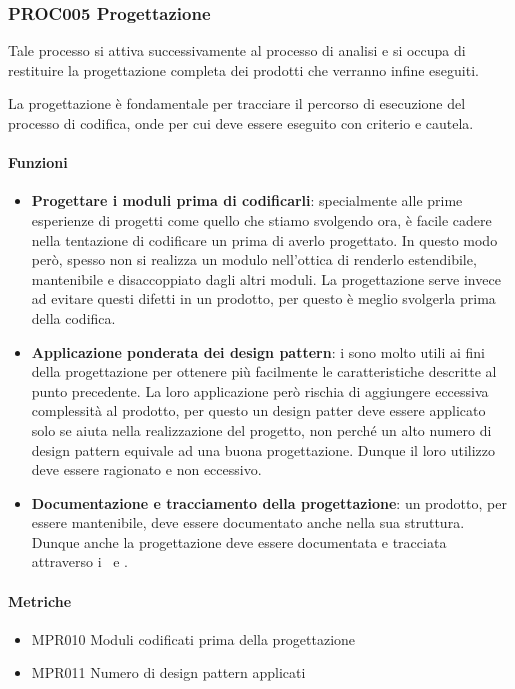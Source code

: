     \subsubsection{PROC005 Progettazione}\label{proc005}
    Tale processo si attiva successivamente al processo di analisi e si occupa di restituire la progettazione completa dei prodotti che verranno infine eseguiti. \par
    La progettazione è fondamentale per tracciare il percorso di esecuzione del processo di codifica, onde per cui deve essere eseguito con criterio e cautela.

        \paragraph*{Funzioni}
        \begin{itemize}
            \item \textbf{Progettare i moduli prima di codificarli}: specialmente alle prime esperienze di progetti come quello che stiamo svolgendo ora, è facile cadere nella tentazione di codificare un  prima di averlo progettato. In questo modo però, spesso non si realizza un modulo nell'ottica di renderlo estendibile, mantenibile e disaccoppiato dagli altri moduli. La progettazione serve invece ad evitare questi difetti in un prodotto, per questo è meglio svolgerla prima della codifica.
            \item \textbf{Applicazione ponderata dei design pattern}: i  sono molto utili ai fini della progettazione per ottenere più facilmente le caratteristiche descritte al punto precedente. La loro applicazione però rischia di aggiungere eccessiva complessità al prodotto, per questo un design patter deve essere applicato solo se aiuta nella realizzazione del progetto, non perché un alto numero di design pattern equivale ad una buona progettazione. Dunque il loro utilizzo deve essere ragionato e non eccessivo.
            \item \textbf{Documentazione e tracciamento della progettazione}: un prodotto, per essere mantenibile, deve essere documentato anche nella sua struttura. Dunque anche la progettazione deve essere documentata e tracciata attraverso i \MUd\ e \MSd.
        \end{itemize}

        \paragraph*{Metriche}
        \begin{itemize}
            \item MPR010 Moduli codificati prima della progettazione
            \item MPR011 Numero di design pattern applicati
        \end{itemize}

